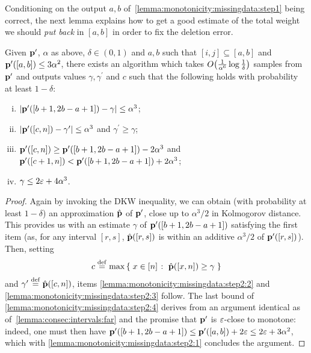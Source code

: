 Conditioning on the output $a,b$ of~\cref{lemma:monotonicity:missingdata:step1} being correct, the next lemma explains how to get a good estimate of the total weight we should \emph{put back} in $[a,b]$ in order to fix the deletion error.
\begin{lemma}\label{lemma:monotonicity:missingdata:step2}
Given $\mathbf{p}^\prime$, $\alpha$ as above, $\delta\in(0,1)$ and $a,b$ such that $[i,j]\subseteq[a,b]$ and $\mathbf{p}^\prime([a,b]) \leq 3\alpha^2$, there exists an algorithm which takes $\bigO{\frac{1}{\alpha^6}\log\frac{1}{\delta}}$ samples from $\mathbf{p}^\prime$ and outputs values $\gamma, \gamma^\prime$ and $c$ such that the following holds with probability at least $1-\delta$: 
\begin{enumerate}[(i)]
  \item\label{lemma:monotonicity:missingdata:step2:1}
         $\left\lvert  \mathbf{p}^\prime([b+1,2b-a+1])-\gamma  \right\rvert \leq \alpha^3$;
  \item\label{lemma:monotonicity:missingdata:step2:2}
         $\left\lvert  \mathbf{p}^\prime([c,n])-\gamma^\prime  \right\rvert \leq \alpha^3$ and $\gamma^\prime\geq \gamma$;
  \item\label{lemma:monotonicity:missingdata:step2:3}
         $\mathbf{p}^\prime([c,n]) \geq \mathbf{p}^\prime([b+1,2b-a+1]) - 2\alpha^3$ and $\mathbf{p}^\prime([c+1,n]) < \mathbf{p}^\prime([b+1,2b-a+1]) + 2\alpha^3$;
  \item\label{lemma:monotonicity:missingdata:step2:4}
         $\gamma \leq 2\varepsilon+4\alpha^3$.
\end{enumerate}
\end{lemma} 
\begin{proof}
 Again by invoking the DKW inequality, we can obtain (with probability at least $1-\delta$) an approximation $\hat{\mathbf{p}}$ of $\mathbf{p}^\prime$, close up to $\alpha^3/2$ in Kolmogorov distance. This provides us with an estimate $\gamma$ of $\mathbf{p}^\prime([b+1,2b-a+1])$ satisfying the first item (as, for any interval $[r,s]$, $\hat{\mathbf{p}}([r,s])$ is within an additive $\alpha^3/2$ of $\mathbf{p}^\prime([r,s])$). Then, setting 
 \[
    c \stackrel{\rm def}{=} \max \left\{\;  x\in[n]  \;\colon\;  \hat{\mathbf{p}}([x,n]) \geq \gamma \; \right\}
 \]
 and $\gamma^\prime \stackrel{\rm def}{=} \hat{\mathbf{p}}([c,n])$, items \ref{lemma:monotonicity:missingdata:step2:2} and \ref{lemma:monotonicity:missingdata:step2:3} follow. The last bound of \ref{lemma:monotonicity:missingdata:step2:4} derives from an argument identical as of~\cref{lemma:consec:intervals:far} and the promise that $\mathbf{p}^\prime$ is $\varepsilon$-close to monotone: indeed, one must then have $\mathbf{p}^\prime([b+1,2b-a+1]) \leq \mathbf{p}^\prime([a,b]) + 2\varepsilon \leq 2\varepsilon + 3\alpha^2$, which with \ref{lemma:monotonicity:missingdata:step2:1} concludes the argument.
\end{proof} 

